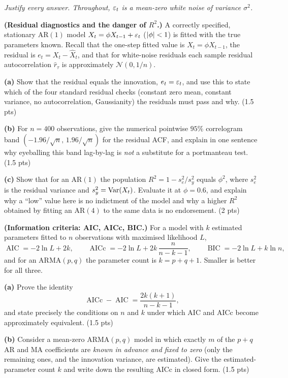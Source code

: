 \documentclass[11pt]{article}
\DeclareMathOperator{\AIC}{AIC}
\DeclareMathOperator{\AICc}{AICc}
\DeclareMathOperator{\BIC}{BIC}
\begin{document}
\pointstable
\begin{center}\itshape Justify every answer. Throughout, $\varepsilon_t$ is a mean-zero white noise of variance $\sigma^2$.\end{center}

\textbf{(Residual diagnostics and the danger of $R^2$.)} A correctly specified, stationary AR$(1)$ model $X_t=\phi X_{t-1}+\varepsilon_t$ ($\left\lvert \phi \right\rvert<1$) is fitted with the true parameters known. Recall that the one-step fitted value is $\hat X_t=\phi X_{t-1}$, the residual is $e_t=X_t-\hat X_t$, and that for white-noise residuals each sample residual autocorrelation $\hat r_\tau$ is approximately $\mathcal N(0,1/n)$.

\textbf{(a)} Show that the residual equals the innovation, $e_t=\varepsilon_t$, and use this to state which of the four standard residual checks (constant zero mean, constant variance, no autocorrelation, Gaussianity) the residuals must pass and why. \hfill(1.5 pts)

\textbf{(b)} For $n=400$ observations, give the numerical pointwise $95\%$ correlogram band $(-1.96/\sqrt n,\,1.96/\sqrt n)$ for the residual ACF, and explain in one sentence why eyeballing this band lag-by-lag is \emph{not} a substitute for a portmanteau test. \hfill(1.5 pts)

\textbf{(c)} Show that for an AR$(1)$ the population $R^2=1-s_e^2/s_y^2$ equals $\phi^2$, where $s_e^2$ is the residual variance and $s_y^2=\operatorname{Var}(X_t)$. Evaluate it at $\phi=0.6$, and explain why a ``low'' value here is no indictment of the model and why a higher $R^2$ obtained by fitting an AR$(4)$ to the same data is no endorsement. \hfill(2 pts)
\answerpage

\textbf{(Information criteria: AIC, AICc, BIC.)} For a model with $k$ estimated parameters fitted to $n$ observations with maximised likelihood $L$,
\[
\AIC=-2\ln L+2k,\qquad
\AICc=-2\ln L+2k\,\frac{n}{n-k-1},\qquad
\BIC=-2\ln L+k\ln n,
\]
and for an ARMA$(p,q)$ the parameter count is $k=p+q+1$. Smaller is better for all three.

\textbf{(a)} Prove the identity
\[
\AICc-\AIC=\frac{2k(k+1)}{n-k-1},
\]
and state precisely the conditions on $n$ and $k$ under which AIC and AICc become approximately equivalent. \hfill(1.5 pts)

\textbf{(b)} Consider a mean-zero ARMA$(p,q)$ model in which exactly $m$ of the $p+q$ AR and MA coefficients are \emph{known in advance and fixed to zero} (only the remaining ones, and the innovation variance, are estimated). Give the estimated-parameter count $k$ and write down the resulting AICc in closed form. \hfill(1.5 pts)
\end{document}
